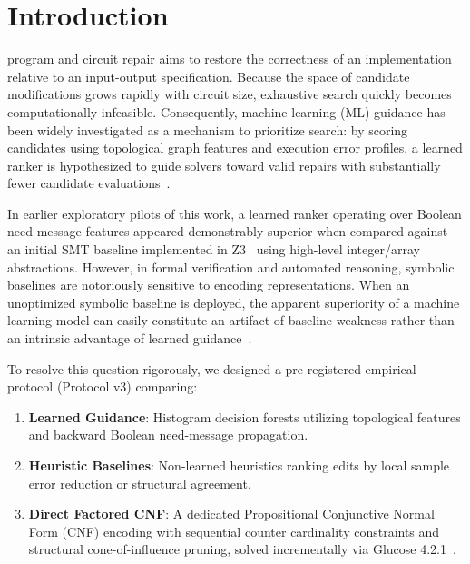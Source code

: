 \documentclass[10pt,journal,compsoc]{IEEEtran}
\begin{document}
\maketitle
\IEEEdisplaynontitleabstractindextext
\IEEEpeerreviewmaketitle

\section{Introduction}
 program and circuit repair aims to restore the correctness of an implementation relative to an input-output specification. Because the space of candidate modifications grows rapidly with circuit size, exhaustive search quickly becomes computationally infeasible. Consequently, machine learning (ML) guidance has been widely investigated as a mechanism to prioritize search: by scoring candidates using topological graph features and execution error profiles, a learned ranker is hypothesized to guide solvers toward valid repairs with substantially fewer candidate evaluations~\cite{cosler2023neural,barke2020just}.

In earlier exploratory pilots of this work, a learned ranker operating over Boolean need-message features appeared demonstrably superior when compared against an initial SMT baseline implemented in Z3~\cite{demoura2008z3} using high-level integer/array abstractions. However, in formal verification and automated reasoning, symbolic baselines are notoriously sensitive to encoding representations. When an unoptimized symbolic baseline is deployed, the apparent superiority of a machine learning model can easily constitute an artifact of baseline weakness rather than an intrinsic advantage of learned guidance~\cite{xu2008satzilla}.

To resolve this question rigorously, we designed a pre-registered empirical protocol (Protocol v3) comparing:
\begin{enumerate}
    \item \textbf{Learned Guidance}: Histogram decision forests utilizing topological features and backward Boolean need-message propagation.
    \item \textbf{Heuristic Baselines}: Non-learned heuristics ranking edits by local sample error reduction or structural agreement.
    \item \textbf{Direct Factored CNF}: A dedicated Propositional Conjunctive Normal Form (CNF) encoding with sequential counter cardinality constraints and structural cone-of-influence pruning, solved incrementally via Glucose 4.2.1~\cite{audemard2018glucose,ignatiev2018pysat}.
\end{enumerate}
\end{document}
